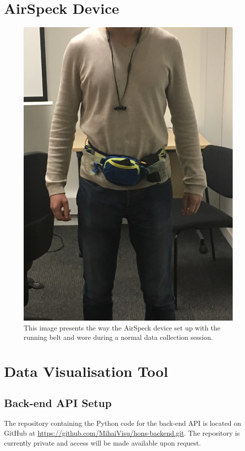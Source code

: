 \documentclass[bsc,frontabs,twoside,singlespacing, parskip,deptreport]{infthesis}     %
\begin{document}
\begin{appendices}

\chapter{AirSpeck Device}

\begin{figure}[h!]
  \center
  \includegraphics[width=0.6\columnwidth]{airspeck_on_me.jpg}
  \caption{This image presents the way the AirSpeck device set up with the running belt and wore during a normal data collection session.}
  \label{fig:airspeck_on_me}
\end{figure}

\chapter{Data Visualisation Tool}


\section{Back-end API Setup}

The repository containing the Python code for the back-end API is located on GitHub at \url{https://github.com/MihaiVisu/hons-backend.git}. The repository is currently private and access will be made available upon request.


\end{appendices}
\end{document}
